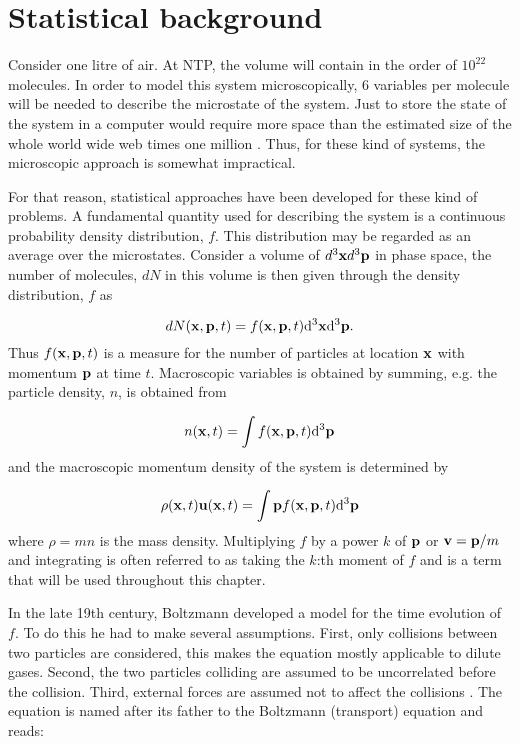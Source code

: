 \section{Statistical background}\label{sec:lbm:stat}
Consider one litre of air. At NTP, the volume will contain in the
order of $10^{22}$ molecules. In order to model this system
microscopically, 6 variables per molecule will be needed to describe
the microstate of the system. Just to store the state of the system in
a computer would require more space than the estimated size of the
whole world wide web times one million \cite{wolfram-alpha-web}. Thus,
for these kind of systems, the microscopic approach is somewhat
impractical.

For that reason, statistical approaches have been developed for these
kind of problems. A fundamental quantity used for describing the
system is a continuous probability density distribution, $f$. This
distribution may be regarded as an average over the
microstates. Consider a volume of $d^3\mathbf{x} d^3\mathbf{p}$ in phase
space, the number of molecules, $dN$ in this volume is then given
through the density distribution, $f$ as

\begin{equation}
dN(\mathbf{x}, \mathbf{p}, t) = f(\mathbf{x}, \mathbf{p}, t)\mathrm{d}^3\mathbf{x} \mathrm{d}^3\mathbf{p}.
\end{equation}
Thus $f(\mathbf{x}, \mathbf{p}, t)$ is a measure for the number of particles at
location $\mathbf{x}$ with momentum $\mathbf{p}$ at time $t$. Macroscopic variables is
obtained by summing, e.g. the particle density, $n$, is obtained from

\begin{equation}
n(\mathbf{x}, t) = \int f(\mathbf{x}, \mathbf{p}, t) \mathrm{d}^3\mathbf{p}
\end{equation}
and the macroscopic momentum density of the system is determined by

\begin{equation}
\rho(\mathbf{x}, t) \mathbf{u}(\mathbf{x}, t) = \int \mathbf{p} f(\mathbf{x}, \mathbf{p}, t) \mathrm{d}^3\mathbf{p}
\end{equation}
where $\rho = m n$ is the mass density. Multiplying $f$ by a power $k$ of
$\mathbf{p}$ or $\mathbf{v} = \mathbf{p}/m$ and integrating is often referred to as
taking the $k$:th moment of $f$ and is a term that will be used
throughout this chapter.

In the late 19th century, Boltzmann developed a model for the time
evolution of $f$. To do this he had to make several
assumptions. First, only collisions between two particles are
considered, this makes the equation mostly applicable to dilute
gases. Second, the two particles colliding are assumed to be
uncorrelated before the collision. Third, external forces are assumed
not to affect the collisions \cite{wolf-gladrow}. The equation is
named after its father to the Boltzmann (transport) equation and
reads:

